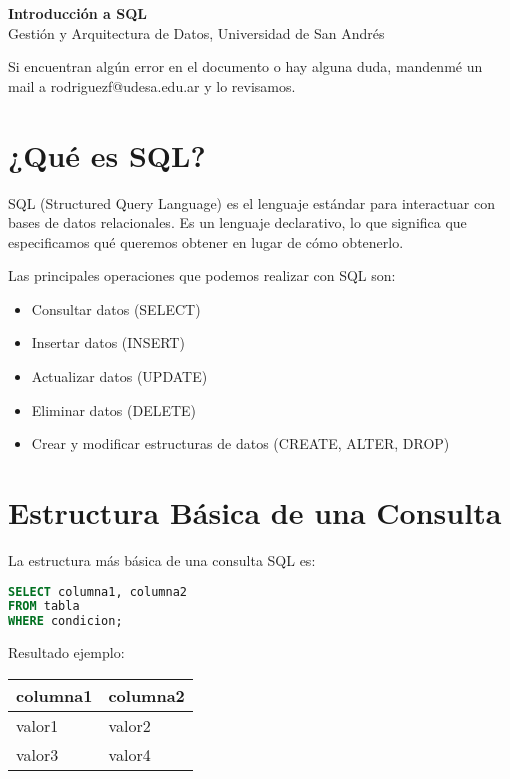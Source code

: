 \documentclass[12pt]{article}
\begin{document}
\begin{center}
  {\LARGE \textbf{Introducción a SQL}}\\[0.5em]
  {Gestión y Arquitectura de Datos, Universidad de San Andrés}
\end{center}

Si encuentran algún error en el documento o hay alguna duda, mandenmé un mail a rodriguezf@udesa.edu.ar y lo revisamos.

\section{¿Qué es SQL?}
SQL (Structured Query Language) es el lenguaje estándar para interactuar con bases de datos relacionales. Es un lenguaje declarativo, lo que significa que especificamos qué queremos obtener en lugar de cómo obtenerlo.

\vspace{1em}

Las principales operaciones que podemos realizar con SQL son:
\begin{itemize}
    \item Consultar datos (SELECT)
    \item Insertar datos (INSERT)
    \item Actualizar datos (UPDATE)
    \item Eliminar datos (DELETE)
    \item Crear y modificar estructuras de datos (CREATE, ALTER, DROP)
\end{itemize}

\section{Estructura Básica de una Consulta}
La estructura más básica de una consulta SQL es:

\begin{lstlisting}[language=SQL]
SELECT columna1, columna2
FROM tabla
WHERE condicion;
\end{lstlisting}

Resultado ejemplo:
\begin{center}
\begin{tabular}{ll}
\toprule
columna1 & columna2 \\
\midrule
valor1 & valor2 \\
valor3 & valor4 \\
\bottomrule
\end{tabular}
\end{center}
\end{document}
